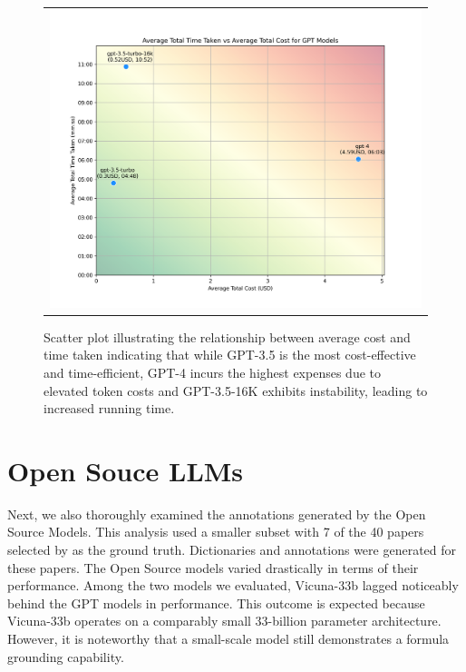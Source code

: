 \begin{figure}[htpb]
  \centering
  \begin{tabular}{c}
  \includegraphics[width=14cm]{images/gpt-time-v-cost.png}
  \end{tabular}
  \caption[Cost vs Time]{Scatter plot illustrating the relationship between average cost and time taken indicating that while GPT-3.5 is the most cost-effective and time-efficient, GPT-4 incurs the highest expenses due to elevated token costs and GPT-3.5-16K exhibits instability, leading to increased running time.}\label{fig:gpt-time-v-cost}
\end{figure}


\section{Open Souce LLMs}

Next, we also thoroughly examined the annotations generated by the Open Source Models. This analysis used a smaller subset with 7 of the 40 papers selected by \citet{asakura2022building} as the ground truth. Dictionaries and annotations were generated for these papers. The Open Source models varied drastically in terms of their performance. Among the two models we evaluated, Vicuna-33b lagged noticeably behind the GPT models in performance. This outcome is expected because Vicuna-33b operates on a comparably small 33-billion parameter architecture. However, it is noteworthy that a small-scale model still demonstrates a formula grounding capability.

